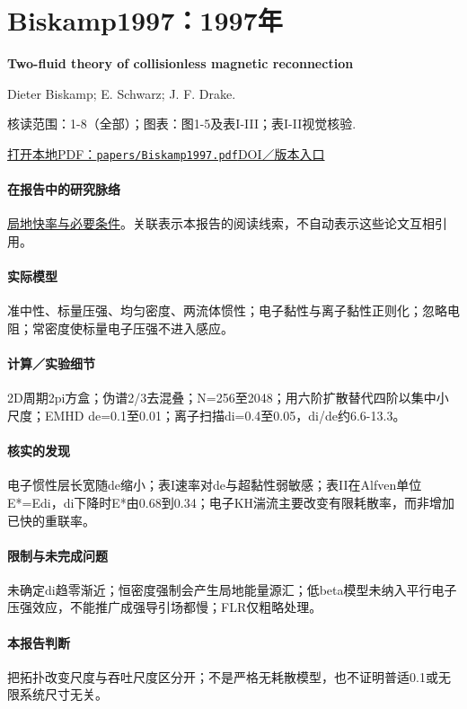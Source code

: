 \documentclass[UTF8,a4paper,11pt,openany,fontset=fandol]{ctexbook}
\begin{document}
\section{Biskamp1997：1997年}\label{paper:Biskamp1997}

\textbf{Two-fluid theory of collisionless magnetic reconnection}\citep{Biskamp1997}\

Dieter Biskamp;  E. Schwarz;  J. F. Drake.

\textsf{核读范围：}1-8（全部）；\textsf{图表：}图1-5及表I-III；表I-II视觉核验.

\href{run:../papers/Biskamp1997.pdf}{打开本地PDF：\texttt{papers/Biskamp1997.pdf}}\quad\href{https://doi.org/10.1063/1.872211}{DOI／版本入口}

\paragraph{在报告中的研究脉络}\hyperref[story:fast]{局地快率与必要条件}。关联表示本报告的阅读线索，不自动表示这些论文互相引用。

\paragraph{实际模型}准中性、标量压强、均匀密度、两流体惯性；电子黏性与离子黏性正则化；忽略电阻；常密度使标量电子压强不进入感应。

\paragraph{计算／实验细节}2D周期2pi方盒；伪谱2/3去混叠；N=256至2048；用六阶扩散替代四阶以集中小尺度；EMHD de=0.1至0.01；离子扫描di=0.4至0.05，di/de约6.6-13.3。

\paragraph{核实的发现}电子惯性层长宽随de缩小；表I速率对de与超黏性弱敏感；表II在Alfven单位E*=Edi，di下降时E*由0.68到0.34；电子KH湍流主要改变有限耗散率，而非增加已快的重联率。

\paragraph{限制与未完成问题}未确定di趋零渐近；恒密度强制会产生局地能量源汇；低beta模型未纳入平行电子压强效应，不能推广成强导引场都慢；FLR仅粗略处理。

\paragraph{本报告判断}把拓扑改变尺度与吞吐尺度区分开；不是严格无耗散模型，也不证明普适0.1或无限系统尺寸无关。
\end{document}
